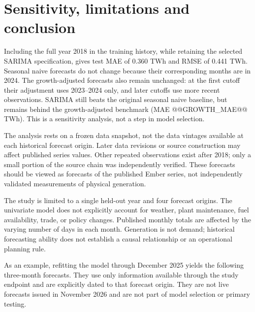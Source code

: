 \documentclass[11pt,a4paper,twoside,reqno]{amsart}
\numberwithin{equation}{section}
\begin{document}
\section{Sensitivity, limitations and conclusion}

Including the full year 2018 in the training history, while retaining the selected SARIMA specification, gives test MAE of 0.360 TWh and RMSE of 0.441 TWh. Seasonal naive forecasts do not change because their corresponding months are in 2024. The growth-adjusted forecasts also remain unchanged: at the first cutoff their adjustment uses 2023--2024 only, and later cutoffs use more recent observations. SARIMA still beats the original seasonal naive baseline, but remains behind the growth-adjusted benchmark (MAE @@GROWTH_MAE@@ TWh). This is a sensitivity analysis, not a step in model selection.\par

The analysis rests on a frozen data snapshot, not the data vintages available at each historical forecast origin. Later data revisions or source construction may affect published series values. Other repeated observations exist after 2018; only a small portion of the source chain was independently verified. These forecasts should be viewed as forecasts of the published Ember series, not independently validated measurements of physical generation.\par

The study is limited to a single held-out year and four forecast origins. The univariate model does not explicitly account for weather, plant maintenance, fuel availability, trade, or policy changes. Published monthly totals are affected by the varying number of days in each month. Generation is not demand; historical forecasting ability does not establish a causal relationship or an operational planning rule.\par

As an example, refitting the model through December 2025 yields the following three-month forecasts. They use only information available through the study endpoint and are explicitly dated to that forecast origin. They are not live forecasts issued in November 2026 and are not part of model selection or primary testing.\par
\end{document}
